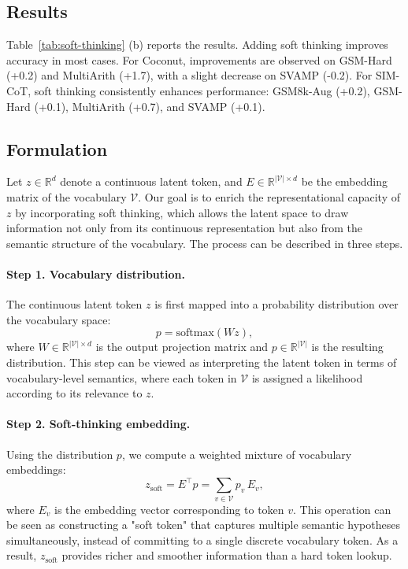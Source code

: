 \subsection{Results}
Table~\ref{tab:soft-thinking} (b) reports the results.  
Adding soft thinking improves accuracy in most cases.  
For Coconut, improvements are observed on GSM-Hard (+0.2) and MultiArith (+1.7), with a slight decrease on SVAMP (-0.2).  
For SIM-CoT, soft thinking consistently enhances performance: GSM8k-Aug (+0.2), GSM-Hard (+0.1), MultiArith (+0.7), and SVAMP (+0.1).

\subsection{Formulation}
Let $z \in \mathbb{R}^d$ denote a continuous latent token, and $E \in \mathbb{R}^{|\mathcal{V}| \times d}$ be the embedding matrix of the vocabulary $\mathcal{V}$.  
Our goal is to enrich the representational capacity of $z$ by incorporating soft thinking, which allows the latent space to draw information not only from its continuous representation but also from the semantic structure of the vocabulary. The process can be described in three steps.

\paragraph{Step 1. Vocabulary distribution.}  
The continuous latent token $z$ is first mapped into a probability distribution over the vocabulary space:
\[
p = \text{softmax}(W z),
\]
where $W \in \mathbb{R}^{|\mathcal{V}| \times d}$ is the output projection matrix and $p \in \mathbb{R}^{|\mathcal{V}|}$ is the resulting distribution.  
This step can be viewed as interpreting the latent token in terms of vocabulary-level semantics, where each token in $\mathcal{V}$ is assigned a likelihood according to its relevance to $z$.

\paragraph{Step 2. Soft-thinking embedding.}  
Using the distribution $p$, we compute a weighted mixture of vocabulary embeddings:
\[
z_{\text{soft}} = E^\top p = \sum_{v \in \mathcal{V}} p_v \, E_v ,
\]
where $E_v$ is the embedding vector corresponding to token $v$.  
This operation can be seen as constructing a "soft token" that captures multiple semantic hypotheses simultaneously, instead of committing to a single discrete vocabulary token. As a result, $z_{\text{soft}}$ provides richer and smoother information than a hard token lookup.

